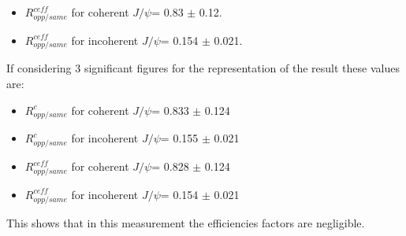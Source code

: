 \begin{itemize}
\item $ R_{opp/same}^{ceff}$ for coherent $J/\psi$= 0.83 $\pm$ 0.12.
\item $ R_{opp/same}^{ceff} $ for incoherent $J/\psi$= 0.154 $\pm$ 0.021.
\end{itemize}

If considering 3 significant figures for the representation of the result these values are: 
\begin{itemize}
\item $ R_{opp/same}^{c}$ for coherent $J/\psi$= 0.833 $\pm$ 0.124
\item $ R_{opp/same}^{c}$ for incoherent $J/\psi$= 0.155 $\pm$ 0.021
\item $ R_{opp/same}^{ceff}$ for coherent $J/\psi$= 0.828 $\pm$ 0.124
\item $ R_{opp/same}^{ceff} $ for incoherent $J/\psi$= 0.154 $\pm$ 0.021
\end{itemize}

This shows that in this measurement the efficiencies factors are negligible. 


